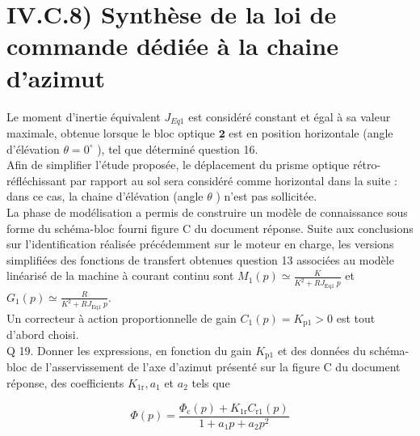 \documentclass[10pt]{article}
\begin{document}
\section*{IV.C.8) Synthèse de la loi de commande dédiée à la chaine d'azimut}
Le moment d'inertie équivalent $J_{E q 1}$ est considéré constant et égal à sa valeur maximale, obtenue lorsque le bloc optique $\underline{\mathbf{2}}$ est en position horizontale (angle d'élévation $\theta=0^{\circ}$ ), tel que déterminé question 16.\\
Afin de simplifier l'étude proposée, le déplacement du prisme optique rétro-réfléchissant par rapport au sol sera considéré comme horizontal dans la suite : dans ce cas, la chaine d'élévation (angle $\theta$ ) n'est pas sollicitée.\\
La phase de modélisation a permis de construire un modèle de connaissance sous forme du schéma-bloc fourni figure C du document réponse. Suite aux conclusions sur l'identification réalisée précédemment sur le moteur en charge, les versions simplifiées des fonctions de transfert obtenues question 13 associées au modèle linéarisé de la machine à courant continu sont $M_{1}(p) \simeq \frac{K}{K^{2}+R J_{\text {Eq1 }} p}$ et $G_{1}(p) \simeq \frac{R}{K^{2}+R J_{\text {Eq1 }} p}$.\\
Un correcteur à action proportionnelle de gain $C_{1}(p)=K_{\mathrm{p} 1}>0$ est tout d'abord choisi.\\
Q 19. Donner les expressions, en fonction du gain $K_{\mathrm{p} 1}$ et des données du schéma-bloc de l'asservissement de l'axe d'azimut présenté sur la figure C du document réponse, des coefficients $K_{1 \mathrm{r}}, a_{1}$ et $a_{2}$ tels que

$$
\Phi(p)=\frac{\Phi_{\mathrm{c}}(p)+K_{1 \mathrm{r}} C_{\mathrm{r} 1}(p)}{1+a_{1} p+a_{2} p^{2}}
$$
\end{document}
